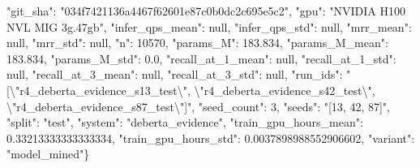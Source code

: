 "git\_sha": "034f7421136a4467f62601e87c0b0dc2c695e5c2", "gpu": "NVIDIA H100 NVL MIG 3g.47gb", "infer\_qps\_mean": null, "infer\_qps\_std": null, "mrr\_mean": null, "mrr\_std": null, "n": 10570, "params\_M": 183.834, "params\_M\_mean": 183.834, "params\_M\_std": 0.0, "recall\_at\_1\_mean": null, "recall\_at\_1\_std": null, "recall\_at\_3\_mean": null, "recall\_at\_3\_std": null, "run\_ids": "[\textbackslash{}"r4\_deberta\_evidence\_s13\_test\textbackslash{}", \textbackslash{}"r4\_deberta\_evidence\_s42\_test\textbackslash{}", \textbackslash{}"r4\_deberta\_evidence\_s87\_test\textbackslash{}"]", "seed\_count": 3, "seeds": "[13, 42, 87]", "split": "test", "system": "deberta\_evidence", "train\_gpu\_hours\_mean": 0.33213333333333334, "train\_gpu\_hours\_std": 0.0037898988552906602, "variant": "model\_mined"\}

